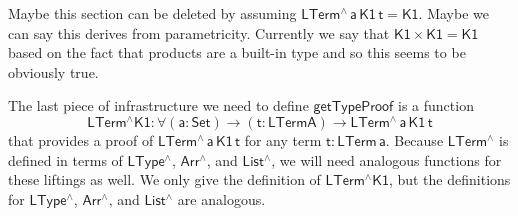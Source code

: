 \documentclass[9pt]{entcs}
\begin{document}
{\color{red} Maybe this section can be deleted by assuming $\mathsf{LTerm^{\wedge}\, a\, K1\,t = K1}$.
Maybe we can say this derives from parametricity.
Currently we say that $\mathsf{K1 \times K1 = K1}$ based on the fact that products are a built-in type and so this seems to be obviously true.}

The last piece of infrastructure we need to define $\mathsf{getTypeProof}$ is a function 
\[
  \mathsf{LTerm^{\wedge}K1 : \forall (a : Set) \to (t : LTerm A) \to LTerm^{\wedge}\, a\, K1\,t}
\]
that provides a 
proof of $\mathsf{LTerm^{\wedge}\,a\,K1\,t}$ for any term $\mathsf{t : LTerm\, a}$. 
Because $\mathsf{LTerm^{\wedge}}$ is defined in terms of $\mathsf{LType^{\wedge}}$, $\mathsf{Arr^{\wedge}}$, 
and $\mathsf{List^{\wedge}}$, we will need analogous functions for these liftings as well. 
We only give the definition of $\mathsf{LTerm^{\wedge}K1}$, but the definitions for 
$\mathsf{LType^{\wedge}}$, $\mathsf{Arr^{\wedge}}$, and $\mathsf{List^{\wedge}}$ are analogous. 
\end{document}
